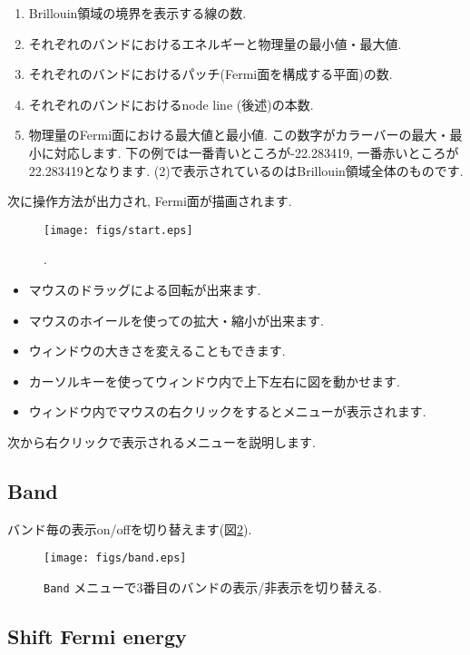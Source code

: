 \documentclass[12pt]{jarticle}
\begin{document}
\begin{enumerate}
  \renewcommand{\labelenumi}{(\arabic{enumi})}
  \item Brillouin領域の境界を表示する線の数.
  \item それぞれのバンドにおけるエネルギーと物理量の最小値・最大値.
  \item それぞれのバンドにおけるパッチ(Fermi面を構成する平面)の数.
  \item それぞれのバンドにおけるnode line (後述)の本数.
  \item 物理量のFermi面における最大値と最小値.
    この数字がカラーバーの最大・最小に対応します. 
    下の例では一番青いところが-22.283419, 一番赤いところが22.283419となります.
    (2)で表示されているのはBrillouin領域全体のものです.    
\end{enumerate}

次に操作方法が出力され, Fermi面が描画されます. 

\begin{figure}[!ht]
  \texttt{[image: figs/start.eps]}
  \caption{.}
  \label{fig_start}
\end{figure}

\begin{itemize}
\item マウスのドラッグによる回転が出来ます. 
\item マウスのホイールを使っての拡大・縮小が出来ます. 
\item ウィンドウの大きさを変えることもできます. 
\item カーソルキーを使ってウィンドウ内で上下左右に図を動かせます. 
\item ウィンドウ内でマウスの右クリックをするとメニューが表示されます. 
\end{itemize}

次から右クリックで表示されるメニューを説明します. 

\subsection{Band}

バンド毎の表示on/offを切り替えます(図\ref{fig_band}).

\begin{figure}[!ht]
  \texttt{[image: figs/band.eps]}
  \caption{\texttt{Band} メニューで3番目のバンドの表示/非表示を切り替える.}
  \label{fig_band}
\end{figure}

\subsection{Shift Fermi energy}
\end{document}
